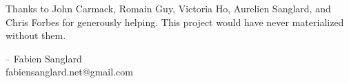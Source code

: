 Thanks to John Carmack, Romain Guy, Victoria Ho, Aurelien Sanglard, and Chris Forbes for generously helping. This project would have never
materialized without them.\\ 
\par
-- Fabien Sanglard\\
fabiensanglard.net@gmail.com
